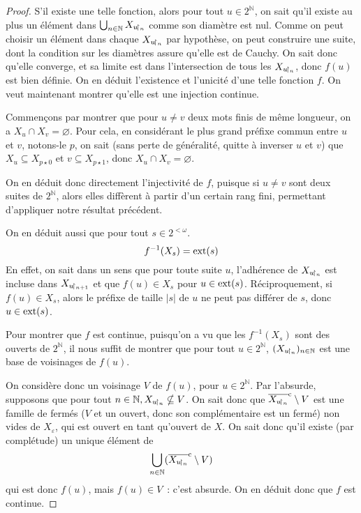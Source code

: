 \begin{proof}
  S'il existe une telle fonction, alors pour tout $u \in 2^{\mathbb N}$, on
  sait qu'il existe au plus un élément dans
  $\bigcup_{n \in \mathbb N} X_{u\!\upharpoonright_{n}}$ comme son diamètre est nul. Comme on
  peut choisir un élément dans chaque $X_{u\!\upharpoonright_{n}}$ par hypothèse, on peut
  construire une suite, dont la condition sur les diamètres assure qu'elle est
  de Cauchy. On sait donc qu'elle converge, et sa limite est dans l'intersection
  de tous les $X_{u\!\upharpoonright_{n}}$, donc $f(u)$ est bien définie. On en déduit
  l'existence et l'unicité d'une telle fonction $f$. On veut maintenant montrer
  qu'elle est une injection continue.
  
  Commençons par montrer que pour $u \neq v$ deux mots finis de même longueur,
  on a $X_u \cap X_v = \varnothing$. Pour cela, en considérant le plus grand
  préfixe commun entre $u$ et $v$, notons-le $p$, on sait (sans perte de
  généralité, quitte à inverser $u$ et $v$) que $X_u \subseteq X_{p\star 0}$ et
  $v \subseteq X_{p\star 1}$, donc $X_u\cap X_v =\varnothing$.

  On en déduit donc directement l'injectivité de $f$, puisque si $u \neq v$
  sont deux suites de $2^\mathbb N$, alors elles diffèrent à partir d'un certain
  rang fini, permettant d'appliquer notre résultat précédent.

  On en déduit aussi que pour tout $s \in 2^{<\omega}$.
  \[f^{-1}(X_s) = \operatorname{ext}(s)\]
  En effet, on sait dans un sens que pour toute suite $u$, l'adhérence de
  $X_{u\!\upharpoonright_{n}}$ est incluse dans $X_{u \!\upharpoonright_{n + 1}}$ et que $f(u) \in X_s$ pour
  $u \in \operatorname{ext}(s)$. Réciproquement, si $f(u) \in X_s$, alors le préfixe de taille
  $|s|$ de $u$ ne peut pas différer de $s$, donc $u \in \operatorname{ext}(s)$.

  Pour montrer que $f$ est continue, puisqu'on a vu que les $f^{-1}(X_s)$ sont
  des ouverts de $2^\mathbb N$, il nous suffit de montrer que pour tout
  $u \in 2^\mathbb N$, $(X_{u\!\upharpoonright_{n}})_{n \in \mathbb N}$ est une base de voisinages
  de $f(u)$.

  On considère donc un voisinage $V$ de $f(u)$, pour $u \in 2^\mathbb N$. Par
  l'absurde, supposons que pour tout $n \in\mathbb N, X_{u\!\upharpoonright_{n}} \nsubseteq V$.
  On sait donc que $\overline{X_{u\!\upharpoonright_{n}}}^{\mathrm c} \setminus V$ est une famille de
  fermés ($V$ et un ouvert, donc son complémentaire est un fermé) non vides
  de $X_{\varepsilon}$, qui est ouvert en tant qu'ouvert de $X$. On sait donc
  qu'il existe (par complétude) un unique élément de
  \[\bigcup_{n \in \mathbb N} (\overline{X_{u\!\upharpoonright_{n}}}^{\mathrm c}\setminus V)\]
  qui est donc $f(u)$, mais $f(u) \in V$~: c'est absurde. On en déduit donc que
  $f$ est continue.
\end{proof}

